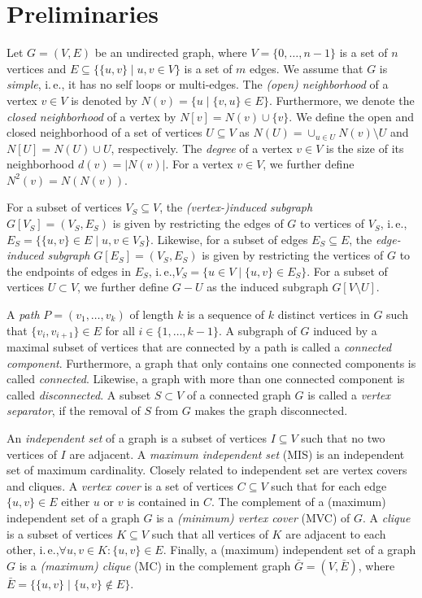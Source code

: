 \documentclass[a4paper,UKenglish,cleveref, autoref, thm-restate]{lipics-v2021}
\newcommand{\ie}{i.\,e.,\xspace}
\begin{document}
\section{Preliminaries}
Let $G=(V,E)$ be an undirected graph, where $V = \{0, \ldots, n-1\}$ is a set of $n$ vertices and $E \subseteq  \{\{u,v\} \mid u,v \in V\}$ is a set of $m$ edges. 
We assume that $G$ is \emph{simple}, \ie it has no self loops or multi-edges.
The \emph{(open) neighborhood} of a vertex $v \in V$ is denoted by $N(v) = \{u \mid \{v,u\} \in E\}$.
Furthermore, we denote the \emph{closed neighborhood} of a vertex by $N[v]=N(v) \cup \{v\}$.
We define the open and closed neighborhood of a set of vertices $U \subseteq V$
as $N(U) = \cup_{u \in U} N(v) \setminus U$ and $N[U] = N(U) \cup U$, respectively.
The \emph{degree} of a vertex $v \in V$ is the size of its neighborhood $d(v) = |N(v)|$.
For a vertex $v \in V$, we further define $N^2(v) = N(N(v))$.

For a subset of vertices $V_S \subseteq V$, the \emph{(vertex-)induced subgraph}
$G[V_S] = (V_S, E_S)$ is given by restricting the edges of $G$ to vertices of $V_S$, \ie $E_S = \{\{u,v\} \in E \mid u,v \in V_S\}$.
Likewise, for a subset of edges $E_S \subseteq E$, the \emph{edge-induced
  subgraph} $G[E_S] = (V_S, E_S)$ is given by restricting the vertices of $G$ to the endpoints of edges in $E_S$, \ie $V_S = \{u \in V \mid \{u,v\} \in E_S\}$.
  For a subset of vertices $U \subset V$, we further define $G - U$ as the induced subgraph $G[V \setminus U]$.

A \emph{path} $P=(v_1, \ldots, v_k)$ of length $k$ is a sequence of $k$ distinct vertices in $G$ such that $\{v_i, v_{i+1}\} \in E$ for all $i \in \{1, \ldots, k-1\}$.
A subgraph of $G$ induced by a maximal subset of vertices that are connected by a path is called a \emph{connected component}.
Furthermore, a graph that only contains one connected components is called \emph{connected}.
Likewise, a graph with more than one connected component is called \emph{disconnected}.
A subset $S \subset V$ of a connected graph $G$ is called a \emph{vertex separator}, if the removal of $S$ from $G$ makes the graph disconnected.

An \emph{independent set} of a graph is a subset of vertices $I \subseteq V$ such that no two vertices of $I$ are adjacent. 
A \emph{maximum independent set} (MIS) is an independent set of maximum cardinality.
Closely related to independent set are vertex covers and cliques.
A \emph{vertex cover} is a set of vertices $C \subseteq V$ such that for each edge $\{u,v\} \in E$ either $u$ or $v$ is contained in $C$.
The complement of a (maximum) independent set of a graph $G$ is a \emph{(minimum) vertex cover} (MVC) of $G$.
A \emph{clique} is a subset of vertices $K \subseteq V$ such that all vertices of $K$ are adjacent to each other, \ie $\forall u,v \in K: \{u,v\} \in E$.
Finally, a (maximum) independent set of a graph $G$ is a \emph{(maximum) clique} (MC) in the complement graph $\bar{G} = (V, \bar{E})$, where $\bar{E} = \{\{u,v\} \mid \{u,v\} \not\in E\}$.
\end{document}
